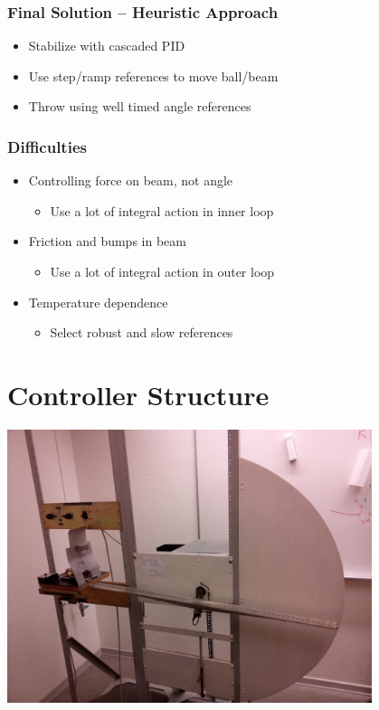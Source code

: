 \documentclass[
compress]
{beamer}
\begin{document}
\begin{frame}
\frametitle{Final Solution -- Heuristic Approach}
\begin{itemize}
\item Stabilize with cascaded PID
\item Use step/ramp references to move ball/beam
\item Throw using well timed angle references
\end{itemize}
\end{frame}

\begin{frame}
\frametitle{Difficulties}
\begin{itemize}
\item Controlling force on beam, not angle
\begin{itemize}
\item Use a lot of integral action in inner loop
\end{itemize}
\item Friction and bumps in beam
\begin{itemize}
\item Use a lot of integral action in outer loop
\end{itemize}
\item Temperature dependence
\begin{itemize}
\item Select robust and slow references
\end{itemize}
\end{itemize}
\end{frame}

\section{Controller Structure}
\frame{\sectionpage}
\begin{frame}
\centering
\includegraphics[width=0.8\textwidth]{figures/process_fig.jpg}
\end{frame}
\end{document}
